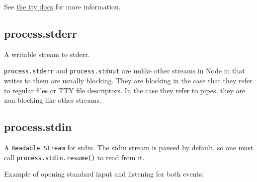 \begin{Shaded}
\begin{Highlighting}[]
 

 
\end{Highlighting}
\end{Shaded}

See \href{tty.html\#tty\_tty}{the tty docs} for more information.

\subsection{process.stderr}

A writable stream to stderr.

\texttt{process.stderr} and \texttt{process.stdout} are unlike other
streams in Node in that writes to them are usually blocking. They are
blocking in the case that they refer to regular files or TTY file
descriptors. In the case they refer to pipes, they are non-blocking like
other streams.

\subsection{process.stdin}

A \texttt{Readable Stream} for stdin. The stdin stream is paused by
default, so one must call \texttt{process.stdin.resume()} to read from
it.

Example of opening standard input and listening for both events:

\begin{Shaded}
\begin{Highlighting}[]
\NormalTok{();}
\NormalTok{(}\NormalTok{);}

\NormalTok{(}\NormalTok{, }
  \NormalTok{(} 
\NormalTok{\});}

\NormalTok{(}\NormalTok{, }\NormalTok{() \{}
  \NormalTok{(}\NormalTok{);}
\NormalTok{\});}
\end{Highlighting}
\end{Shaded}

